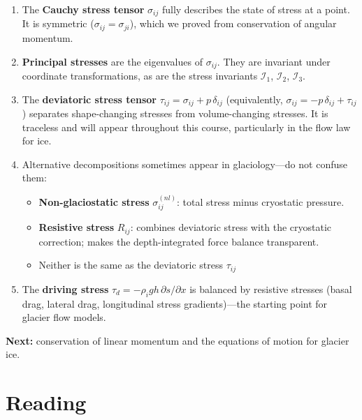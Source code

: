 \documentclass[11pt]{article}
\begin{document}
\begin{enumerate}
  \item The \textbf{Cauchy stress tensor} $\sigma_{ij}$ fully describes the state of stress at a point.  It is symmetric ($\sigma_{ij} = \sigma_{ji}$), which we proved from conservation of angular momentum.

  \item \textbf{Principal stresses} are the eigenvalues of $\sigma_{ij}$.  They are invariant under coordinate transformations, as are the stress invariants $\mathcal{I}_1$, $\mathcal{I}_2$, $\mathcal{I}_3$.

  \item The \textbf{deviatoric stress tensor} $\tau_{ij} = \sigma_{ij} + p\,\delta_{ij}$ (equivalently, $\sigma_{ij} = -p\,\delta_{ij} + \tau_{ij}$) separates shape-changing stresses from volume-changing stresses.  It is traceless and will appear throughout this course, particularly in the flow law for ice.

  \item Alternative decompositions sometimes appear in glaciology---do not confuse them:
  \begin{itemize}
    \item \textbf{Non-glaciostatic stress} $\sigma_{ij}^{(nl)}$: total stress minus cryostatic pressure.
    \item \textbf{Resistive stress} $R_{ij}$: combines deviatoric stress with the cryostatic correction; makes the depth-integrated force balance transparent.
    \item Neither is the same as the deviatoric stress $\tau_{ij}$
   \end{itemize}

  \item The \textbf{driving stress} $\tau_d = -\rho_i g h\,\partial s/\partial x$ is balanced by resistive stresses (basal drag, lateral drag, longitudinal stress gradients)---the starting point for glacier flow models.
\end{enumerate}

\medskip
\noindent \textbf{Next:} conservation of linear momentum and the equations of motion for glacier ice.

\section*{Reading}
\end{document}
